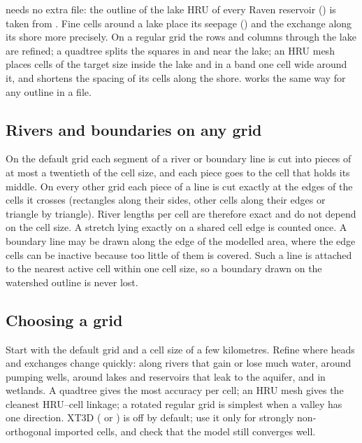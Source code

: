  needs no extra file: the outline of the lake HRU of every Raven reservoir () is taken
from . Fine cells around a lake place its seepage () and the exchange along its shore
more precisely. On a regular grid the rows and columns through the lake are refined; a quadtree splits the squares in and
near the lake; an HRU mesh places cells of the target size inside the lake and in a band one cell wide around it, and
shortens the spacing of its cells along the shore.  works the same way for any outline in a file.

\subsection{Rivers and boundaries on any grid}
On the default grid each segment of a river or boundary line is cut into pieces of at most a twentieth of the cell size,
and each piece goes to the cell that holds its middle. On every other grid each piece of a line is cut exactly at the edges of the cells it crosses (rectangles along their
sides, other cells along their edges or triangle by triangle). River lengths per cell are therefore exact and do not
depend on the cell size. A stretch lying exactly on a shared cell edge
is counted once. A boundary line may be drawn along the edge of the modelled area, where the edge cells can be inactive because too little
of them is covered. Such a line is attached to the nearest active cell within one cell size, so a boundary drawn on the
watershed outline is never lost.

\subsection{Choosing a grid}
Start with the default grid and a cell size of a few kilometres. Refine where heads and exchanges change quickly: along
rivers that gain or lose much water, around pumping wells, around lakes and reservoirs that leak to the aquifer, and in
wetlands. A quadtree gives the most accuracy per cell;
an HRU mesh gives the cleanest HRU--cell linkage; a rotated regular grid is simplest when a valley has one direction. XT3D
( or ) is off by default; use it only for strongly non-orthogonal imported cells, and
check that the model still converges well.

